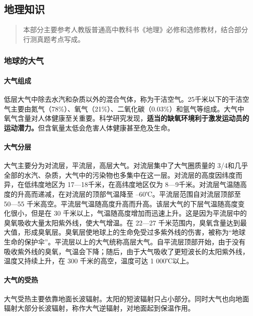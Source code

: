 \subsection{地理知识}

\begin{quote}
	本部分主要参考人教版普通高中教科书《地理》必修和选修教材，结合部分行测真题考点写成。
\end{quote}

\subsubsection{地球的大气}

\paragraph{大气组成}

低层大气中除去水汽和杂质以外的混合气体，称为干洁空气。25千米以下的干洁空气主要由氮气（78\%）、氧气（21\%）、二氧化碳（0.03\%）和氩气等组成。大气中氧气含量对人体健康至关重要。科学研究发现，\textbf{适当的缺氧环境利于激发运动员的运动潜力。}但含氧量太低会危害人体健康甚至危及生命。

\paragraph{大气分层}

大气主要分为对流层，平流层，高层大气。对流层集中了大气圈质量的 3/4和几乎全部的水汽、杂质，大气中的污染物也多集中在这一层。对流层的高度因纬度而异，在低纬度地区为 17—18千米，在高纬度地区仅为 8—9千米。对流层气温随高度的升高而递减，在对流层的顶部气温降至 –60℃。平流层范围自对流层顶部至 50—55 千米高空。平流层气温随高度升高而升高。该层大气的下层气温随高度变化很小，但是在 30 千米以上，气温随高度增加而迅速上升。这是因为平流层中的臭氧吸收大量太阳紫外线，使大气增温。在 22—27 千米范围内，臭氧含量达到最大值，形成臭氧层。臭氧层使地球上的生命免受过多紫外线的伤害，被称为“地球生命的保护伞”。平流层以上的大气统称高层大气。自平流层顶部开始，由于没有吸收紫外线的臭氧，气温会下降；随后，由于大气吸收了更短波长的太阳紫外线，温度又持续上升，在 300 千米的高空，温度可达 1 000℃以上。

\paragraph{大气的受热}

大气受热主要依靠地面长波辐射。太阳的短波辐射只占小部分。同时大气也向地面辐射大部分长波辐射，称作大气逆辐射，对地面起到保温作用。

